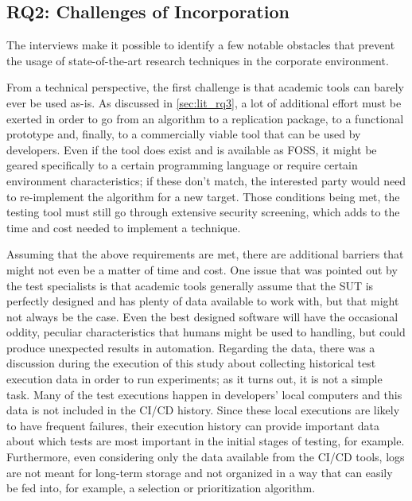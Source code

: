 \subsection{RQ2: Challenges of Incorporation}
\label{sec:ind_rq2}

The interviews make it possible to identify a few notable obstacles that prevent the usage of state-of-the-art research techniques in the corporate environment.

From a technical perspective, the first challenge is that academic tools can barely ever be used as-is.
As discussed in \autoref{sec:lit_rq3}, a lot of additional effort must be exerted in order to go from an algorithm to a replication package, to a functional prototype and, finally, to a commercially viable tool that can be used by developers.
Even if the tool does exist and is available as FOSS, it might be geared specifically to a certain programming language or require certain environment characteristics; if these don't match, the interested party would need to re-implement the algorithm for a new target.
Those conditions being met, the testing tool must still go through extensive security screening, which adds to the time and cost needed to implement a technique.

Assuming that the above requirements are met, there are additional barriers that might not even be a matter of time and cost.
One issue that was pointed out by the test specialists is that academic tools generally assume that the SUT is perfectly designed and has plenty of data available to work with, but that might not always be the case.
Even the best designed software will have the occasional oddity, peculiar characteristics that humans might be used to handling, but could produce unexpected results in automation.
Regarding the data, there was a discussion during the execution of this study about collecting historical test execution data in order to run experiments; as it turns out, it is not a simple task.
Many of the test executions happen in developers' local computers and this data is not included in the CI/CD history.
Since these local executions are likely to have frequent failures, their execution history can provide important data about which tests are most important in the initial stages of testing, for example.
Furthermore, even considering only the data available from the CI/CD tools, logs are not meant for long-term storage and not organized in a way that can easily be fed into, for example, a selection or prioritization algorithm.

